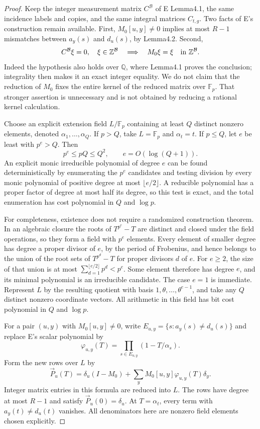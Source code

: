 \begin{proof}
Keep the integer measurement matrix $C^{\mathcal B}$ of E Lemma4.1, the same incidence labels and copies, and the same integral matrices $C_{t,g}$. Two facts of E's construction remain available. First, $M_0[u,y]\ne0$ implies at most $R-1$ mismatches between $a_y(s)$ and $d_u(s)$, by Lemma4.2. Second,
\[
   C^{\mathcal B}\xi=0,\quad \xi\in\mathbb Z^{\mathcal B}
                  \quad\Longrightarrow\quad M_0\xi=\xi
                       \quad\hbox{in }\mathbb Z^{\mathcal B}.
\]
Indeed the hypothesis also holds over $\mathbb Q$, where Lemma4.1 proves the conclusion; integrality then makes it an exact integer equality. We do not claim that the reduction of $M_0$ fixes the entire kernel of the reduced matrix over $\mathbb F_p$. That stronger assertion is unnecessary and is not obtained by reducing a rational kernel calculation.

Choose an explicit extension field $L/\mathbb F_p$ containing at least $Q$ distinct nonzero elements, denoted $\alpha_1,\ldots,\alpha_Q$. If $p>Q$, take $L=\mathbb F_p$ and $\alpha_t=t$. If $p\leq Q$, let $e$ be least with $p^e>Q$. Then
\[
                 p^e\leq pQ\leq Q^2,\qquad e=O(\log(Q+1)).
\]
An explicit monic irreducible polynomial of degree $e$ can be found deterministically by enumerating the $p^e$ candidates and testing division by every monic polynomial of positive degree at most $\lfloor e/2\rfloor$. A reducible polynomial has a proper factor of degree at most half its degree, so this test is exact, and the total enumeration has cost polynomial in $Q$ and $\log p$.

For completeness, existence does not require a randomized construction theorem. In an algebraic closure the roots of $T^{p^e}-T$ are distinct and closed under the field operations, so they form a field with $p^e$ elements. Every element of smaller degree has degree a proper divisor of $e$, by the period of Frobenius, and hence belongs to the union of the root sets of $T^{p^d}-T$ for proper divisors $d$ of $e$. For $e\geq2$, the size of that union is at most
$\sum_{d=1}^{\lfloor e/2\rfloor}p^d<p^e$. Some element therefore has degree $e$, and its minimal polynomial is an irreducible candidate. The case $e=1$ is immediate. Represent $L$ by the resulting quotient with basis $1,\theta,\ldots,\theta^{e-1}$, and take any $Q$ distinct nonzero coordinate vectors. All arithmetic in this field has bit cost polynomial in $Q$ and $\log p$.

For a pair $(u,y)$ with $M_0[u,y]\ne0$, write
$E_{u,y}=\{s:a_y(s)\ne d_u(s)\}$ and replace E's scalar polynomial by
\[
       \varphi_{u,y}(T)=\prod_{s\in E_{u,y}}(1-T/\alpha_s).
\]
Form the new rows over $L$ by
\[
 \vec P_u(T)=\delta_u(I-M_0)
          +\sum_yM_0[u,y]\varphi_{u,y}(T)\delta_y.
\]
Integer matrix entries in this formula are reduced into $L$. The rows have degree at most $R-1$ and satisfy $\vec P_u(0)=\delta_u$. At $T=\alpha_t$, every term with $a_y(t)\ne d_u(t)$ vanishes. All denominators here are nonzero field elements chosen explicitly.


\end{proof}
